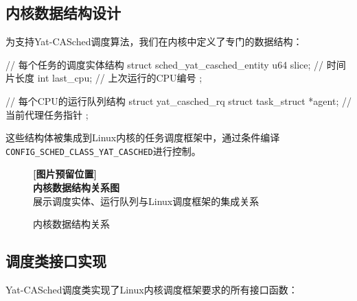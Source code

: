\subsection{内核数据结构设计}

为支持Yat-CASched调度算法，我们在内核中定义了专门的数据结构：

\begin{tcolorbox}[
    colback=yellow!5!white,
    colframe=orange!50!black,
    title=\textbf{核心数据结构实现},
    fonttitle=\bfseries,
    arc=3pt
]
\begin{code}
// 每个任务的调度实体结构
struct sched_yat_casched_entity {
    u64 slice;           // 时间片长度
    int last_cpu;        // 上次运行的CPU编号
};

// 每个CPU的运行队列结构  
struct yat_casched_rq {
    struct task_struct *agent;  // 当前代理任务指针
};
\end{code}
\end{tcolorbox}

这些结构体被集成到Linux内核的任务调度框架中，通过条件编译\texttt{CONFIG\_SCHED\_CLASS\_YAT\_CASCHED}进行控制。

\begin{figure}[htbp]
\centering
\begin{tcolorbox}[
    colback=gray!10,
    colframe=gray!50,
    width=0.85\textwidth,
    center,
    arc=3pt
]
\centering
\textbf{[图片预留位置]}\\
\textbf{内核数据结构关系图}\\
\footnotesize{展示调度实体、运行队列与Linux调度框架的集成关系}
\end{tcolorbox}
\caption{内核数据结构关系}
\label{fig:kernel_structure}
\end{figure}

\subsection{调度类接口实现}

Yat-CASched调度类实现了Linux内核调度框架要求的所有接口函数：

